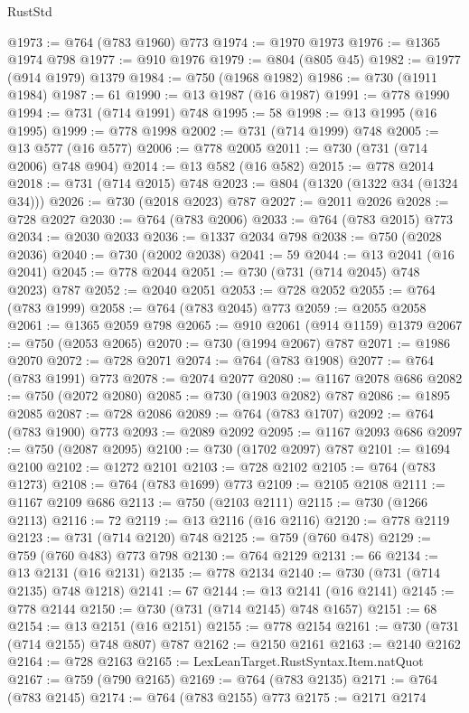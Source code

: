 \begin{lexlean}{RustStd}
\begin{coremodule}
@1973 := @764 (@783 @1960) @773
@1974 := @1970 @1973
@1976 := @1365 @1974 @798
@1977 := @910 @1976
@1979 := @804 (@805 @45)
@1982 := @1977 (@914 @1979) @1379
@1984 := @750 (@1968 @1982)
@1986 := @730 (@1911 @1984)
@1987 := 61
@1990 := @13 @1987 (@16 @1987)
@1991 := @778 @1990
@1994 := @731 (@714 @1991) @748
@1995 := 58
@1998 := @13 @1995 (@16 @1995)
@1999 := @778 @1998
@2002 := @731 (@714 @1999) @748
@2005 := @13 @577 (@16 @577)
@2006 := @778 @2005
@2011 := @730 (@731 (@714 @2006) @748 @904)
@2014 := @13 @582 (@16 @582)
@2015 := @778 @2014
@2018 := @731 (@714 @2015) @748
@2023 := @804 (@1320 (@1322 @34 (@1324 @34)))
@2026 := @730 (@2018 @2023) @787
@2027 := @2011 @2026
@2028 := @728 @2027
@2030 := @764 (@783 @2006)
@2033 := @764 (@783 @2015) @773
@2034 := @2030 @2033
@2036 := @1337 @2034 @798
@2038 := @750 (@2028 @2036)
@2040 := @730 (@2002 @2038)
@2041 := 59
@2044 := @13 @2041 (@16 @2041)
@2045 := @778 @2044
@2051 := @730 (@731 (@714 @2045) @748 @2023) @787
@2052 := @2040 @2051
@2053 := @728 @2052
@2055 := @764 (@783 @1999)
@2058 := @764 (@783 @2045) @773
@2059 := @2055 @2058
@2061 := @1365 @2059 @798
@2065 := @910 @2061 (@914 @1159) @1379
@2067 := @750 (@2053 @2065)
@2070 := @730 (@1994 @2067) @787
@2071 := @1986 @2070
@2072 := @728 @2071
@2074 := @764 (@783 @1908)
@2077 := @764 (@783 @1991) @773
@2078 := @2074 @2077
@2080 := @1167 @2078 @686
@2082 := @750 (@2072 @2080)
@2085 := @730 (@1903 @2082) @787
@2086 := @1895 @2085
@2087 := @728 @2086
@2089 := @764 (@783 @1707)
@2092 := @764 (@783 @1900) @773
@2093 := @2089 @2092
@2095 := @1167 @2093 @686
@2097 := @750 (@2087 @2095)
@2100 := @730 (@1702 @2097) @787
@2101 := @1694 @2100
@2102 := @1272 @2101
@2103 := @728 @2102
@2105 := @764 (@783 @1273)
@2108 := @764 (@783 @1699) @773
@2109 := @2105 @2108
@2111 := @1167 @2109 @686
@2113 := @750 (@2103 @2111)
@2115 := @730 (@1266 @2113)
@2116 := 72
@2119 := @13 @2116 (@16 @2116)
@2120 := @778 @2119
@2123 := @731 (@714 @2120) @748
@2125 := @759 (@760 @478)
@2129 := @759 (@760 @483) @773 @798
@2130 := @764 @2129
@2131 := 66
@2134 := @13 @2131 (@16 @2131)
@2135 := @778 @2134
@2140 := @730 (@731 (@714 @2135) @748 @1218)
@2141 := 67
@2144 := @13 @2141 (@16 @2141)
@2145 := @778 @2144
@2150 := @730 (@731 (@714 @2145) @748 @1657)
@2151 := 68
@2154 := @13 @2151 (@16 @2151)
@2155 := @778 @2154
@2161 := @730 (@731 (@714 @2155) @748 @807) @787
@2162 := @2150 @2161
@2163 := @2140 @2162
@2164 := @728 @2163
@2165 := LexLeanTarget.RustSyntax.Item.natQuot
@2167 := @759 (@790 @2165)
@2169 := @764 (@783 @2135)
@2171 := @764 (@783 @2145)
@2174 := @764 (@783 @2155) @773
@2175 := @2171 @2174

\end{coremodule}
\end{lexlean}
